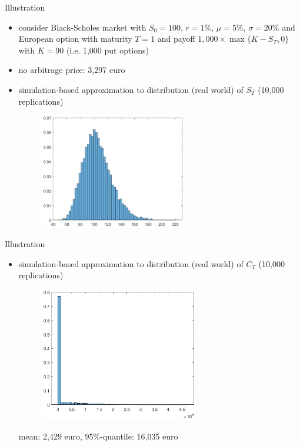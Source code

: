 \documentclass[pdf, handout]{beamer}
\begin{document}
\begin{frame}{Illustration}
\begin{itemize}
\item consider Black-Scholes market with $S_0=100$,
$r=1\%$, $\mu=5\%$, $\sigma=20\%$ and European option with maturity $T=1$
and payoff $1,000\times \max\{K-S_T,0\}$ with $K=90$ (i.e. 1,000 put options)
\item no arbitrage price: 3,297 euro
\item simulation-based approximation to distribution (real world)
of $S_T$ (10,000 replications)
\begin{figure}
\includegraphics[width=0.6\textwidth]{distr_ST.eps}
\end{figure}
\end{itemize}
\end{frame}

\begin{frame}{Illustration}
\begin{itemize}
\item simulation-based approximation to distribution (real world)
of $C_T$ (10,000 replications)
\begin{figure}
\includegraphics[width=0.65\textwidth]{distr_CT.eps}
\end{figure}
mean: 2,429 euro, $95\%$-quantile: 16,035 euro
\end{itemize}
\end{frame}
\end{document}
